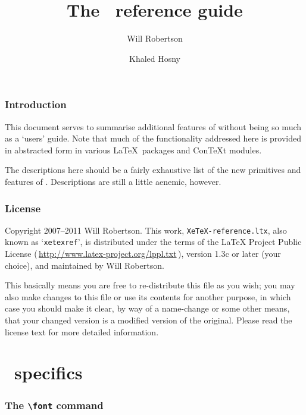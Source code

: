 \documentclass[12pt]{article}
\def\cs#1{\texttt{\textbackslash#1}}
\begin{document}
\title{The \texorpdfstring{\XeTeX}{XeTeX}\ reference guide}
\author{Will Robertson \and Khaled Hosny}
\maketitle

\vfill 

\section*{Introduction}

This document serves to summarise additional features of \XeTeX without
being so much as a ‘users’ guide. Note that much of the functionality
addressed here is provided in abstracted form in various \LaTeX\
packages and Con\TeX{}t modules.

The descriptions here should be a fairly exhaustive list of the new
primitives and features of \XeTeX. Descriptions are still a little
aenemic, however.

\section*{License}

Copyright 2007–2011 Will Robertson. This work,
\verb|XeTeX-reference.ltx|, also known as ‘\verb|xetexref|’, is
distributed under the terms of the LaTeX Project Public License
\textup(\,\url{http://www.latex-project.org/lppl.txt}\,\textup), version
1.3c or later (your choice), and maintained by Will Robertson.

This basically means you are free to re-distribute this file as you
wish; you may also make changes to this file or use its contents for
another purpose, in which case you should make it clear, by way of a
name-change or some other means, that your changed version is a modified
version of the original. Please read the license text for more detailed
information.

\vfill\vfill\vfill\null

\newpage
\tableofcontents

\part{\texorpdfstring{\XeTeX}{XeTeX}\ specifics}

\section{The \cs{font} command}
\end{document}
